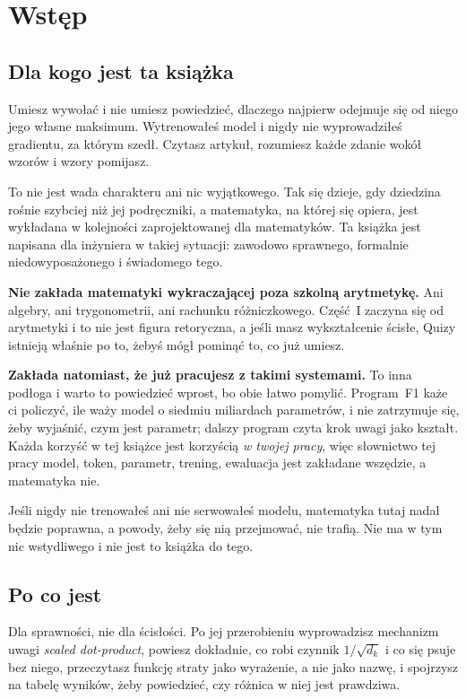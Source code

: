 \chapter*{Wstęp}
{}

\section*{Dla kogo jest ta książka}

Umiesz wywołać  i nie umiesz powiedzieć, dlaczego najpierw
odejmuje się od niego jego własne maksimum. Wytrenowałeś model i nigdy nie
wyprowadziłeś gradientu, za którym szedł. Czytasz artykuł, rozumiesz każde
zdanie wokół wzorów i wzory pomijasz.

To nie jest wada charakteru ani nic wyjątkowego. Tak się dzieje, gdy dziedzina
rośnie szybciej niż jej podręczniki, a matematyka, na której się opiera, jest
wykładana w kolejności zaprojektowanej dla matematyków. Ta książka jest
napisana dla inżyniera w takiej sytuacji: zawodowo sprawnego, formalnie
niedowyposażonego i świadomego tego.

\textbf{Nie zakłada matematyki wykraczającej poza szkolną arytmetykę.} Ani
algebry, ani trygonometrii, ani rachunku różniczkowego. Część~I zaczyna się od
arytmetyki i to nie jest figura retoryczna, a jeśli masz wykształcenie ścisłe,
Quizy istnieją właśnie po to, żebyś mógł pominąć to, co już umiesz.

\textbf{Zakłada natomiast, że już pracujesz z takimi systemami.} To inna
podłoga i warto to powiedzieć wprost, bo obie łatwo pomylić. Program~F1 każe ci
policzyć, ile waży model o siedmiu miliardach parametrów, i nie zatrzymuje się,
żeby wyjaśnić, czym jest parametr; dalszy program czyta krok uwagi jako
kształt. Każda korzyść w tej książce jest korzyścią \emph{w twojej pracy}, więc
słownictwo tej pracy \dash{} model, token, parametr, trening, ewaluacja \dash{}
jest zakładane wszędzie, a matematyka nie.

Jeśli nigdy nie trenowałeś ani nie serwowałeś modelu, matematyka tutaj nadal
będzie poprawna, a powody, żeby się nią przejmować, nie trafią. Nie ma w tym
nic wstydliwego i nie jest to książka do tego.

\section*{Po co jest}

Dla sprawności, nie dla ścisłości. Po jej przerobieniu wyprowadzisz mechanizm
uwagi \emph{scaled dot-product}, powiesz dokładnie, co robi czynnik
$1/\sqrt{d_k}$ i co się psuje bez niego, przeczytasz funkcję straty jako
wyrażenie, a nie jako nazwę, i spojrzysz na tabelę wyników, żeby powiedzieć,
czy różnica w niej jest prawdziwa.

